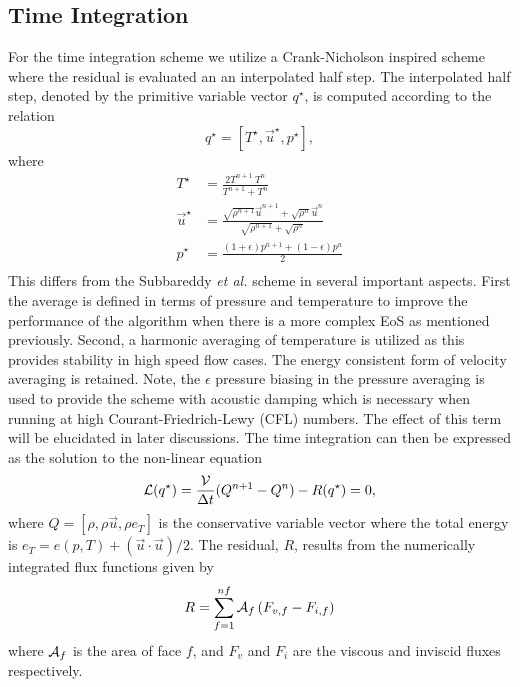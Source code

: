 \subsection{Time Integration}

For the time integration scheme we utilize a Crank-Nicholson inspired
scheme where the residual is evaluated an an interpolated half step.
The interpolated half step, denoted by the primitive variable vector
$q^{\star}$, is computed according to the relation
\begin{equation}
  q^{\star} = \left[ T^{\star}, \vec{u}^{\star}, p^{\star} \right ],
\label{half_step}
\end{equation}
where 
\begin{equation}
\begin{aligned}
  T^{\star} &= \frac{2 T^{n+1} ~ T^{n}}{T^{n+1} + T^{n}} \\
  \vec{u}^{\star} &= \frac{\sqrt{\rho^{n+1}} \vec{u}^{n+1}+\sqrt{\rho^{n}} \vec{u}^n} {\sqrt{\rho^{n+1}}+\sqrt{\rho^n}} \\
p^{\star} &= \frac{(1+\epsilon)p^{n+1} + (1-\epsilon)p^{n}}{2}\\
\label{eq:temporalavg}
\end{aligned}
\end{equation} 
This differs from the Subbareddy {\it et al.} \cite{Subbareddy.2009}
scheme in several important aspects.  First the average is defined in
terms of pressure and temperature to improve the performance
of the algorithm when there is a more complex EoS as mentioned
previously.  Second, a harmonic averaging of temperature is utilized
as this provides stability in high speed flow cases.  The energy
consistent form of velocity averaging is retained.  Note, the
$\epsilon$ pressure biasing in the pressure averaging is used to
provide the scheme with acoustic damping which is necessary when
running at high Courant-Friedrich-Lewy (CFL) numbers.  The effect of
this term will be elucidated in later discussions.  The time
integration can then be expressed as the solution to the non-linear
equation
\begin{equation}
\mathcal{L}(q^{\star})=\frac{\mathcal{V}}{\Delta t} (Q^{n+1} - Q^n) - R(q^{\star}) = 0 ,
\label{Lcn}
\end{equation}
where $Q = \left[ \rho, \rho\vec{u}, \rho e_T \right]$ is the
conservative variable vector where the total energy is $e_T =
e(p,T)+(\vec{u}\cdot \vec{u})/2$.  The residual, $R$, results from the
numerically integrated flux functions given by
\begin{equation}
R = \sum_{f=1}^{nf} \mathcal{A}_f \left( F_{v,f} - F_{i,f} \right)
\end{equation}
where $\mathcal{A}_f$ is the area of face $f$, and $F_v$ and $F_i$ are the
viscous and inviscid fluxes respectively.


